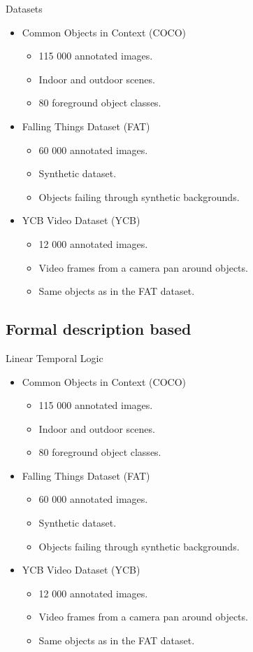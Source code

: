 \documentclass[18pt]{beamer}
\begin{document}
\begin{frame}{Datasets}
\begin{itemize}
	\item Common Objects in Context (COCO)
	\begin{itemize}
		\item 115 000 annotated images.
		\item Indoor and outdoor scenes.
		\item 80 foreground object classes.
	\end{itemize}
	\item Falling Things Dataset (FAT)
	\begin{itemize}
		\item 60 000 annotated images.
		\item Synthetic dataset.
		\item Objects failing through synthetic backgrounds.
	\end{itemize}
	\item YCB Video Dataset (YCB)
	\begin{itemize}
		\item 12 000 annotated images.
		\item Video frames from a camera pan around objects.
		\item Same objects as in the FAT dataset.
	\end{itemize}
\end{itemize}
\end{frame}

\subsection{Formal description based}

\begin{frame}{Linear Temporal Logic}
\begin{itemize}
	\item Common Objects in Context (COCO)
	\begin{itemize}
		\item 115 000 annotated images.
		\item Indoor and outdoor scenes.
		\item 80 foreground object classes.
	\end{itemize}
	\item Falling Things Dataset (FAT)
	\begin{itemize}
		\item 60 000 annotated images.
		\item Synthetic dataset.
		\item Objects failing through synthetic backgrounds.
	\end{itemize}
	\item YCB Video Dataset (YCB)
	\begin{itemize}
		\item 12 000 annotated images.
		\item Video frames from a camera pan around objects.
		\item Same objects as in the FAT dataset.
	\end{itemize}
\end{itemize}
\end{frame}
\end{document}
